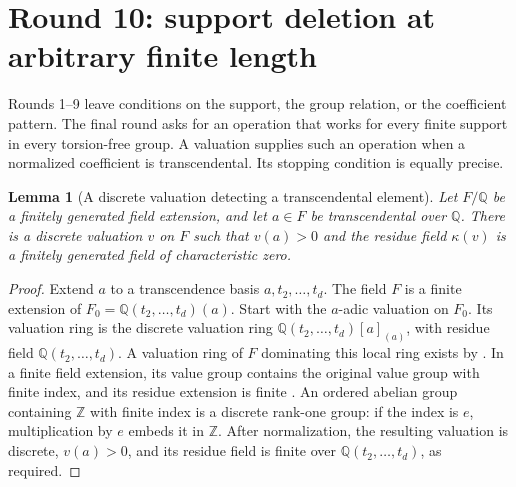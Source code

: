 \documentclass[11pt,a4paper,oneside]{report}
\newtheorem{lemma}[theorem]{Lemma}
\theoremstyle{definition}
\theoremstyle{remark}
\newcommand{\Q}{\mathbb Q}
\newcommand{\Z}{\mathbb Z}
\begin{document}
\section{Round 10: support deletion at arbitrary finite length}
\label{M12:r10:section}

Rounds 1--9 leave conditions on the support, the group relation, or
the coefficient pattern. The final round asks for an operation that
works for every finite support in every torsion-free group. A
valuation supplies such an operation when a normalized coefficient
is transcendental. Its stopping condition is equally precise.

\begin{lemma}[A discrete valuation detecting a transcendental element]
\label{M12:r10:valuation}
Let $F/\Q$ be a finitely generated field extension, and let
$a\in F$ be transcendental over $\Q$. There is a discrete valuation
$v$ on $F$ such that $v(a)>0$ and the residue field $\kappa(v)$ is
a finitely generated field of characteristic zero.
\end{lemma}
\begin{proof}
Extend $a$ to a transcendence basis $a,t_2,\ldots,t_d$.
The field $F$ is a finite extension of
$F_0=\Q(t_2,\ldots,t_d)(a)$.
Start with the $a$-adic valuation on $F_0$. Its valuation ring is
the discrete valuation ring
$\Q(t_2,\ldots,t_d)[a]_{(a)}$, with residue field
$\Q(t_2,\ldots,t_d)$.
A valuation ring of $F$ dominating this local ring exists by
\cite[Lemma 10.50.2]{B:StacksVal}. In a finite field extension, its
value group contains the original value group with finite index,
and its residue extension is finite
\cite[Lemma 15.125.2]{B:StacksExt}. An ordered abelian group containing
$\Z$ with finite index is a discrete rank-one group: if the index
is $e$, multiplication by $e$ embeds it in $\Z$.
After normalization, the resulting valuation is discrete,
$v(a)>0$, and its residue field is finite over
$\Q(t_2,\ldots,t_d)$, as required.
\end{proof}
\end{document}
